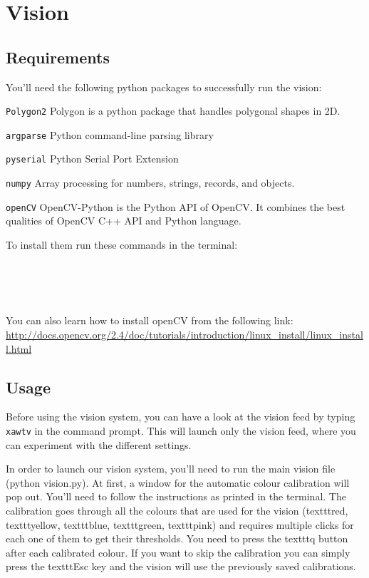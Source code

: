 \section{Vision}

\subsection{Requirements}
You'll need the following python packages to successfully run the vision:

\begin{description}
\item \texttt{Polygon2} Polygon is a python package that handles polygonal shapes in 2D. 
\item \texttt{argparse} Python command-line parsing library
\item \texttt{pyserial} Python Serial Port Extension
\item \texttt{numpy} Array processing for numbers, strings, records, and objects.
\item \texttt{openCV} OpenCV-Python is the Python API of OpenCV. It combines the best qualities of OpenCV C++ API and Python language.
\end{description}

To install them run these commands in the terminal:

 \\
 \\
 \\

You can also learn how to install openCV from the following link:
\url{http://docs.opencv.org/2.4/doc/tutorials/introduction/linux_install/linux_install.html}

\subsection{Usage}
Before using the vision system, you can have a look at the vision feed by typing \texttt{xawtv} in the command prompt. This will launch only the vision feed, where you can experiment with the different settings.

In order to launch our vision system, you'll need to run the main vision file (python vision.py). At first, a window for the automatic colour calibration will pop out. You'll need to follow the instructions as printed in the terminal. The calibration goes through all the colours that are used for the vision (texttt{red}, texttt{yellow}, texttt{blue}, texttt{green}, texttt{pink}) and requires multiple clicks for each one of them to get their thresholds. You need to press the texttt{q} button after each calibrated colour. If you want to skip the calibration you can simply press the texttt{Esc} key and the vision will use the previously saved calibrations.

